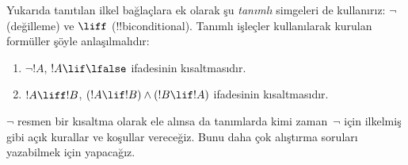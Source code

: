 \documentclass[../../../include/open-logic-section]{subfiles}
\begin{document}
Yukarıda tanıtılan ilkel bağlaçlara ek olarak şu \emph{tanımlı} simgeleri de
kullanırız: $\lnot$ (değilleme) ve $\liff$ (!!{biconditional}). Tanımlı
işleçler kullanılarak kurulan formüller şöyle anlaşılmalıdır:
\begin{enumerate}
\item $\lnot !A$, $!A \lif \lfalse$ ifadesinin kısaltmasıdır.

\item $!A \liff !B$, $(!A \lif !B) \land (!B \lif !A)$ ifadesinin
  kısaltmasıdır.
\end{enumerate}

$\lnot$ resmen bir kısaltma olarak ele alınsa da tanımlarda kimi zaman~$\lnot$
için ilkelmiş gibi açık kurallar ve koşullar vereceğiz. Bunu daha çok alıştırma
soruları yazabilmek için yapacağız.
\end{document}
